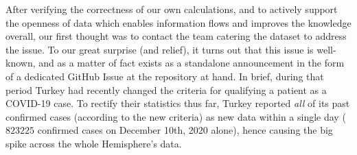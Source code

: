 After verifying the correctness of our own calculations, and to actively support the openness of data which enables information flows and improves the knowledge overall, our first thought was to contact the team catering the dataset to address the issue.
To our great surprise (and relief), it turns out that this issue is well-known, and as a matter of fact exists as a standalone announcement in the form of a dedicated GitHub Issue\cite{ghcsse3484} at the repository at hand.
In brief, during that period Turkey had recently changed the criteria for qualifying a patient as a COVID-19 case.
To rectify their statistics thus far, Turkey reported \textit{all} of its past confirmed cases (according to the new criteria) as new data within a single day ($823225$ confirmed cases on December 10th, 2020 alone), hence causing the big spike across the whole Hemisphere's data.
